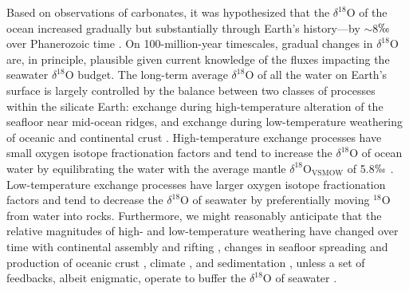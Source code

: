 \documentclass[5p, authoryear]{elsarticle}
\begin{document}
Based on observations of carbonates, it was hypothesized that the $\delta^{18}$O of the ocean increased gradually but substantially through Earth's history---by $\sim$8$\permil$ over Phanerozoic time \citep{Jaffres2007, Veizer1999}. On 100-million-year timescales, gradual changes in $\delta^{18}$O are, in principle, plausible given current knowledge of the fluxes impacting the seawater $\delta^{18}$O budget. The long-term average $\delta^{18}$O of all the water on Earth's surface is largely controlled by the balance between two classes of processes within the silicate Earth: exchange during high-temperature alteration of the seafloor near mid-ocean ridges, and exchange during low-temperature weathering of oceanic and continental crust \citep{Muehlenbachs1998}. High-temperature exchange processes have small oxygen isotope fractionation factors and tend to increase the $\delta^{18}$O of ocean water by equilibrating the water with the average mantle $\delta^{18}$O$_{\text{VSMOW}}$ of 5.8$\permil$ \citep{Muehlenbachs1998}. Low-temperature exchange processes have larger oxygen isotope fractionation factors and tend to decrease the $\delta^{18}$O of seawater by preferentially moving $^{18}$O from water into rocks. Furthermore, we might reasonably anticipate that the relative magnitudes of high- and low-temperature weathering have changed over time with continental assembly and rifting \citep{Collins2003}, changes in seafloor spreading and production of oceanic crust \citep{Muller2008, Fornari1995}, climate \citep{Frakes2005}, and sedimentation \citep{Molnar2004}, unless a set of feedbacks, albeit enigmatic, operate to buffer the $\delta^{18}$O of seawater \citep{Gregory1981, Gregory1991, Muehlenbachs1976, Muehlenbachs1998, Jaffres2007}.  
\end{document}
